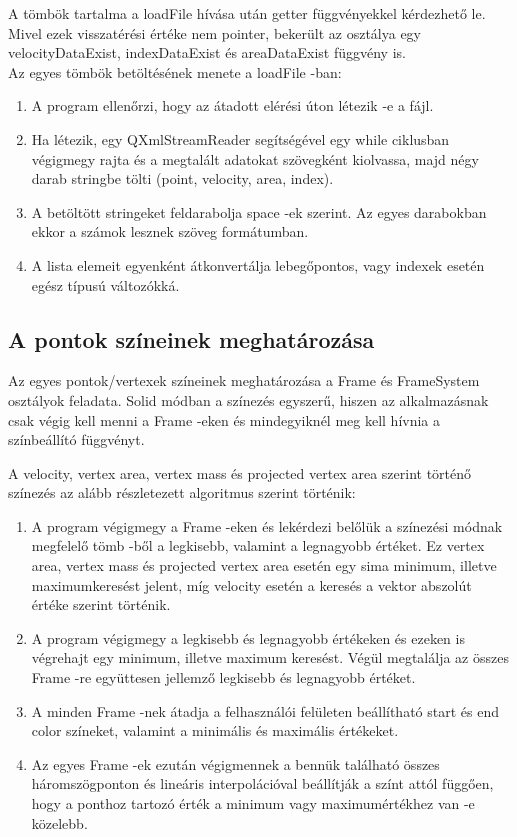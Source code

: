 A tömbök tartalma a {\ttfamily loadFile} hívása után 
getter függvényekkel kérdezhető le. 
Mivel ezek visszatérési értéke nem pointer, 
bekerült az osztálya egy {\ttfamily velocityDataExist}, {\ttfamily indexDataExist} 
és {\ttfamily areaDataExist} függvény is. \\
Az egyes tömbök betöltésének menete a {\ttfamily loadFile} -ban:
\begin{enumerate}
\item
A program ellenőrzi, hogy az átadott elérési úton létezik -e a fájl.
\item
Ha létezik, egy {\ttfamily QXmlStreamReader} segítségével 
egy while ciklusban végigmegy rajta 
és a megtalált adatokat szövegként kiolvassa, 
majd négy darab stringbe tölti ({\ttfamily point}, {\ttfamily velocity}, 
{\ttfamily area}, {\ttfamily index}).
\item
A betöltött stringeket feldarabolja space -ek szerint. 
Az egyes darabokban ekkor a számok lesznek szöveg formátumban.
\item
A lista elemeit egyenként átkonvertálja lebegőpontos, 
vagy indexek esetén egész típusú változókká.
\end{enumerate}

\subsection{A pontok színeinek meghatározása}

Az egyes pontok/vertexek színeinek meghatározása 
a {\ttfamily Frame} és {\ttfamily FrameSystem} osztályok feladata. 
Solid módban a színezés egyszerű, 
hiszen az alkalmazásnak csak végig kell menni a {\ttfamily Frame} -eken 
és mindegyiknél meg kell hívnia a színbeállító függvényt.

A {\ttfamily velocity}, {\ttfamily vertex area}, 
{\ttfamily vertex mass} és {\ttfamily projected vertex area} szerint történő színezés 
az alább részletezett algoritmus szerint történik:
\begin{enumerate}
\item
A program végigmegy a {\ttfamily Frame} -eken és lekérdezi belőlük 
a színezési módnak megfelelő tömb -ből a legkisebb, 
valamint a legnagyobb értéket. 
Ez {\ttfamily vertex area}, {\ttfamily vertex mass} és 
{\ttfamily projected vertex area} esetén egy sima minimum, 
illetve maximumkeresést jelent, 
míg {\ttfamily velocity} esetén a keresés a vektor abszolút értéke szerint történik.
\item
A program végigmegy a legkisebb és legnagyobb értékeken 
és ezeken is végrehajt egy minimum, illetve maximum keresést. 
Végül megtalálja az összes {\ttfamily Frame} -re együttesen jellemző 
legkisebb és legnagyobb értéket.
\item
A minden {\ttfamily Frame} -nek átadja a felhasználói felületen beállítható 
start és end color színeket, 
valamint a minimális és maximális értékeket.
\item
Az egyes {\ttfamily Frame} -ek ezután végigmennek a bennük található összes háromszögponton 
és lineáris interpolációval beállítják a színt attól függően, 
hogy a ponthoz tartozó érték a minimum vagy maximumértékhez van -e közelebb.
\end{enumerate}

